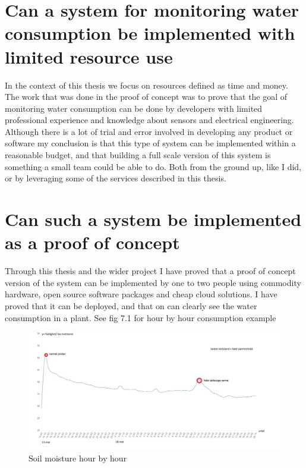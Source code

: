 \documentclass[]{uiophd}
\begin{document}
\section{ Can a system for monitoring water consumption be implemented with limited resource use}

In the context of this thesis we focus on resources defined as time and money. The work that was done in the proof of concept was to prove that the goal of monitoring water consumption can be done by developers with limited professional experience and knowledge about sensors and electrical engineering. Although there is a lot of trial and error involved in developing any product or software my conclusion is that this type of system can be implemented within a reasonable budget, and that building a full scale version of this system is something a small team could be able to do. Both from the ground up, like I did, or by leveraging some of the services described in this thesis.

\section{ Can such a system be implemented as a proof of concept}

Through this thesis and the wider project I have proved that a proof of concept version of the system can be implemented by one to two people using commodity hardware, open source software packages and cheap cloud solutions. I have proved that it can be deployed, and that on can clearly see the water consumption in a plant. See fig 7.1 for hour by hour consumption example
 \begin{figure}[h]
\caption{Soil moisture hour by hour}
\centering
\includegraphics[width=14cm]{warter_hourbyhour.png}
\end{figure}
\end{document}

